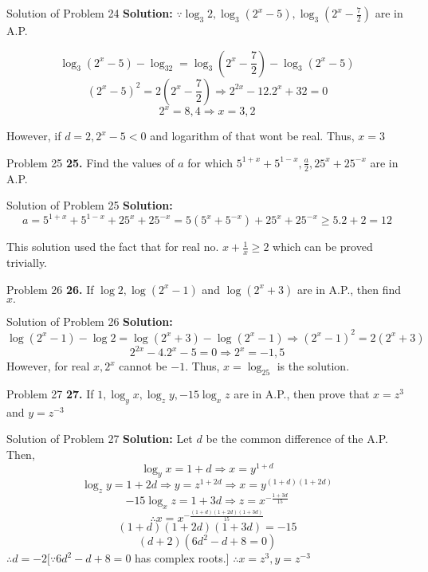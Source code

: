 \documentclass[aspectratio=1610,8pt]{beamer}
\begin{document}
\begin{frame}{Solution of Problem 24}
  \textbf{Solution:} $\because \log_3 2, \log_3(2^x - 5), \log_3\left(2^x - \frac{7}{2}\right)$ are in A.P.

  $$\log_3(2^x - 5) - \log_32 = \log_3\left(2^x - \frac{7}{2}\right) - \log_3(2^x - 5)$$
  $$(2^x - 5)^2 = 2\left(2^x - \frac{7}{2}\right) \Rightarrow 2^{2x} - 12.2^x + 32 = 0$$
  $$2^x = 8, 4\Rightarrow x = 3, 2$$

  However, if $d = 2, 2^x - 5 < 0$ and logarithm of that wont be real. Thus, $x = 3$
\end{frame}
\begin{frame}{Problem 25}
  \textbf{25.} Find the values of $a$ for which $5^{1 + x} + 5^{1 - x}, \frac{a}{2}, 25^x + 25^{-x}$ are in A.P.
\end{frame}
\begin{frame}{Solution of Problem 25}
  \textbf{Solution:} $$a = 5^{1 + x} + 5^{1 - x} + 25^x + 25^{-x} = 5(5^x + 5^{-x}) + 25^x + 25^{-x} \geq 5.2 + 2 = 12$$

  This solution used the fact that for real no. $x + \frac{1}{x}\geq 2$ which can be proved trivially.
\end{frame}
\begin{frame}{Problem 26}
  \textbf{26.} If $\log 2, \log(2^x - 1)$ and $\log(2^x + 3)$ are in A.P., then find $x.$
\end{frame}
\begin{frame}{Solution of Problem 26}
  \textbf{Solution:} $$\log(2^x - 1) - \log 2 = \log(2^x + 3) - \log(2^x - 1) \Rightarrow (2^x - 1)^2 = 2(2^x + 3)$$
  $$2^{2x} - 4.2^x -5 = 0 \Rightarrow 2^x = -1, 5$$
  However, for real $x, 2^x$ cannot be $-1.$ Thus, $x = \log_25$ is the solution.
\end{frame}
\begin{frame}{Problem 27}
  \textbf{27.} If $1, \log_y x, \log_zy, -15\log_xz$ are in A.P., then prove that $x = z^3$ and $y = z^{-3}$
\end{frame}
\begin{frame}{Solution of Problem 27}
  \textbf{Solution:} Let $d$ be the common difference of the A.P. Then,
  $$\log_yx = 1 + d\Rightarrow x = y^{1 + d}$$
  $$\log_zy = 1 + 2d\Rightarrow y = z^{1 + 2d} \Rightarrow x = y^{(1 + d)(1 + 2d)}$$
  $$-15\log_xz = 1 + 3d \Rightarrow z = x^{-\frac{1 + 3d}{15}}$$
  $$\therefore x = x^{-\frac{(1 + d)(1 + 2d)(1 + 3d)}{15}}$$
  $$(1 + d)(1 + 2d)(1 + 3d) = -15$$
  $$(d + 2)(6d^2 - d + 8 = 0)$$
  $\therefore d = -2[\because 6d^2-d + 8 = 0$ has complex roots.$]$
  \linebreak\linebreak
  $\therefore x = z^3, y = z^{-3}$
\end{frame}
\end{document}
